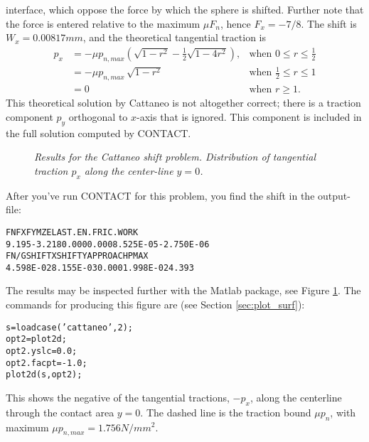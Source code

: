 \documentclass[12pt]{report}
\begin{document}
interface, which oppose the force by which the sphere is shifted. Further
note that the force is entered relative to the maximum $\mu F_n$,
hence $F_x=-7/8$. The shift is $W_x=0.00817\unit{mm}$, and the theoretical
tangential traction is
\begin{equation}
\begin{array}{rll}
 p_x &= -\mu p_{n,max} \left( \sqrt{1-r^2} - \frac{1}{2}
                \sqrt{1-4r^2} \right), &
                \mbox{when } 0 \le r \le \frac{1}{2} \\[0.5ex]
     &= -\mu p_{n,max} \, \sqrt{1-r^2} &
                \mbox{when } \frac{1}{2} \le r \le 1 \\[0.5ex]
     &= 0 & \mbox{when } r \ge 1.
\end{array}
\end{equation}
This theoretical solution by Cattaneo is not altogether correct; there is a
traction component $p_y$ orthogonal to $x$-axis that is ignored. This
component is included in the full solution computed by CONTACT.

\begin{figure}[bt]
\centering
{}
\caption{\em Results for the Cattaneo shift problem. Distribution of
tangential traction $p_x$ along the center-line $y=0$.}
\label{fig:cattaneo_px_y0}
\end{figure}

After you've run CONTACT for this problem, you find the shift in the
output-file:
\begin{alltt}\small
     FN          FX          FY          MZ         ELAST.EN.   FRIC.WORK
         9.195      -3.218       0.000       0.000   8.525E-05  -2.750E-06
     FN/G       SHIFT X      SHIFT Y     APPROACH     PMAX    
     4.598E-02   8.155E-03       0.000   1.998E-02       4.393
\end{alltt}
The results may be inspected further with the Matlab package, see Figure
\ref{fig:cattaneo_px_y0}. The commands for producing this figure are
(see Section \ref{sec:plot_surf}):
\begin{alltt}\small
  s = loadcase('cattaneo',2); % the tangential problem concerns the
  opt2 = plot2d;              % second case in the actual input-file
  opt2.yslc = 0.0;
  opt2.facpt = -1.0;
  plot2d(s, opt2);
\end{alltt}
This shows the negative of the tangential tractions, $-p_x$, along the
centerline through the contact area $y=0$. The dashed line is the traction
bound $\mu p_n$, with maximum $\mu p_{n,max}=1.756\unit{N/mm^2}$.
\end{document}
